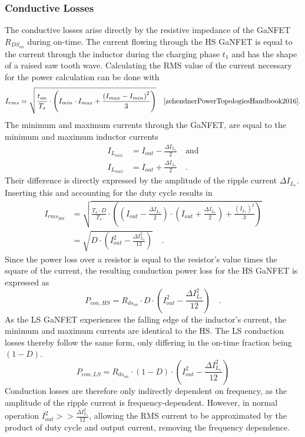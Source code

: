 \subsubsection{Conductive Losses}
The conductive losses arise directly by the resistive impedance of the \ac{GaNFET} $R_{DS_{on}}$ during on-time. The current flowing through the \ac{HS} \ac{GaNFET} is equal to the current through the inductor during the charging phase $t_1$ and has the shape of a raised saw tooth wave. Calculating the \ac{RMS} value of the current necessary for the power calculation can be done with 
\begin{equation}
    I_{rms} = \sqrt{\frac{t_{on}}{T_s} \cdot \left( I_{min}\cdot I_{max}+\frac{\left(I_{max}-I_{min}\right)^2}{3}\right)} \quad\text{\cite{zehendnerPowerTopologiesHandbook2016}.}
    \label{eq:rms_raised_saw_tooth}
\end{equation}
The minimum and maximum currents through the \ac{GaNFET}, are equal to the minimum and maximum inductor currents 
\begin{align}
I_{L_{min}} &= I_{out}-\frac{\Delta I_{L_r}}{2} \quad\text{and}\label{eq:I_L_min}\\ 
I_{L_{max}} &= I_{out}+\frac{\Delta I_{L_r}}{2} \quad\text{.} \label{eq:I_L_max}   
\end{align}
Their difference is directly expressed by the amplitude of the ripple current $\Delta I_{L_r}$. Inserting this and accounting for the duty cycle results in
\begin{align}
    I_{rms_{HS}} &= \sqrt{\frac{T_s\cdot D}{T_s} \cdot \left(\left(I_{out}-\frac{\Delta I_{L_r}}{2}\right)\cdot \left(I_{out}+\frac{\Delta I_{L_r}}{2}\right)+\frac{\left(I_{L_r}\right)^2}{3}\right)}
    \label{eq:rms_HS_GAN_1}\\
    &=\sqrt{D \cdot \left(I_{out}^2 - \frac{\Delta I_{L_r}^2}{12}\right)}\quad\text{.}
    \label{eq:rms_HS_GAN_2}
\end{align}
Since the power loss over a resistor is equal to the resistor's value times the square of the current, the resulting conduction power loss for the \ac{HS} \ac{GaNFET} is expressed as
\begin{equation}
    P_{con,HS} = R_{ds_{on}} \cdot D \cdot \left(I_{out}^2 - \frac{\Delta I_{L_r}^2}{12}\right) \quad\text{.}
    \label{eq:Pon_HS_GAN}
\end{equation} 
As the \ac{LS} \ac{GaNFET} experiences the falling edge of the inductor's current, the minimum and maximum currents are identical to the \ac{HS}. The \ac{LS} conduction losses thereby follow the same form, only differing in the on-time fraction being $\left(1-D\right)$.
\begin{equation}
    P_{con,LS} = R_{ds_{on}} \cdot \left(1-D\right) \cdot \left(I_{out}^2 - \frac{\Delta I_{L_r}^2}{12}\right)
    \label{eq:Pon_LS_GAN}
\end{equation}
Conduction losses are therefore only indirectly dependent on frequency, as the amplitude of the ripple current is frequency-dependent. However, in normal operation $I_{out}^2 >> \frac{\Delta I_{L_r}^2}{12}$, allowing the \ac{RMS} current to be approximated by the product of duty cycle and output current, removing the frequency dependence\cite{depewEfficiencyAnalysisSynchronous2012}. 
